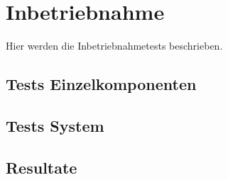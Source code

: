 \section{Inbetriebnahme}
Hier werden die Inbetriebnahmetests beschrieben.

\subsection{Tests Einzelkomponenten}

\subsection{Tests System}

\subsection{Resultate}
